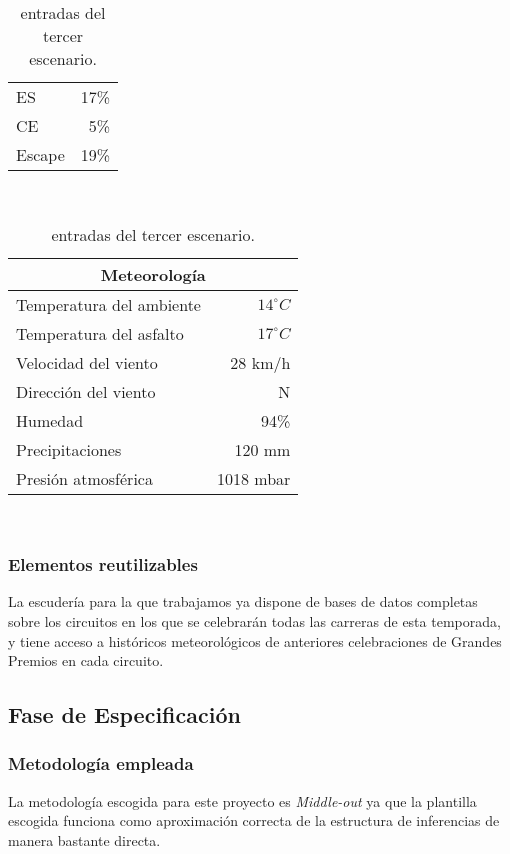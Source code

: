 \documentclass[12pt,a4paper,twoside,spanish]{article}      %
\begin{document}
\begin{table}[H]
\begin{tabular}{lr}
        ES & 17\% \\
        CE & 5\% \\
        Escape & 19\% \\ \bottomrule
    \end{tabular} \\ \vspace{1em}
    \begin{tabular}{lr}
        \toprule
        \multicolumn{2}{c}{\textbf{Meteorología}} \\ \midrule
        Temperatura del ambiente & $14^\circ C$ \\
        Temperatura del asfalto & $17^\circ C$ \\
        Velocidad del viento & 28 km/h \\
        Dirección del viento & N \\
        Humedad & 94\% \\
        Precipitaciones & 120 mm \\
        Presión atmosférica & 1018 mbar \\ \bottomrule
    \end{tabular} \\ \vspace{1em}
    \caption{entradas del tercer escenario.}
    \label{tab:in_esc_2}
\end{table}

\subsubsection{Elementos reutilizables}
La escudería para la que trabajamos ya dispone de bases de datos completas sobre los circuitos en los que se celebrarán todas las carreras de esta temporada, y tiene acceso a históricos meteorológicos de anteriores celebraciones de Grandes Premios en cada circuito.

\subsection{Fase de Especificación}

\subsubsection{Metodología empleada}
La metodología escogida para este proyecto es \textit{Middle-out} ya que la plantilla escogida funciona como aproximación correcta de la estructura de inferencias de manera bastante directa.
\newpage
\end{document}
